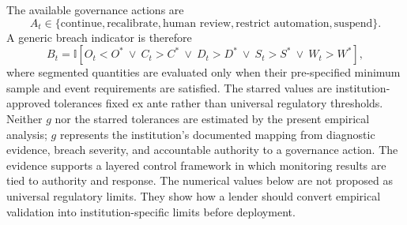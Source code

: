 \documentclass[10pt]{article}
\begin{document}
The available governance actions are
\[
A_t\in\{\text{continue},\text{recalibrate},\text{human review},
\text{restrict automation},\text{suspend}\}.
\]
A generic breach indicator is therefore
\[
B_t=\mathbb{I}
\left[
O_t<O^{*}
\ \lor\ 
C_t>C^{*}
\ \lor\
D_t>D^{*}
\ \lor\
S_t>S^{*}
\ \lor\
W_t>W^{*}
\right],
\]
where segmented quantities are evaluated only when their pre-specified minimum sample and event requirements are satisfied. The starred values are institution-approved tolerances fixed ex ante rather than universal regulatory thresholds. Neither $g$ nor the starred tolerances are estimated by the present empirical analysis; $g$ represents the institution's documented mapping from diagnostic evidence, breach severity, and accountable authority to a governance action. The evidence supports a layered control framework in which monitoring results are tied to authority and response. The numerical values below are not proposed as universal regulatory limits. They show how a lender should convert empirical validation into institution-specific limits before deployment.
\end{document}
